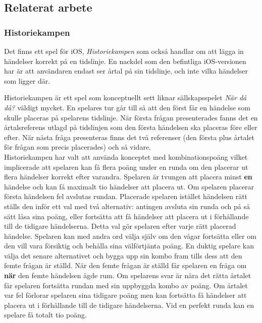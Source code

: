 \documentclass[a4paper, 11pt]{article}
\begin{document}
\subsection{Relaterat arbete}

\subsubsection{Historiekampen}
Det finns ett spel för iOS, \textit{Historiekampen} \cite{historiekampen} som också handlar om att lägga in händelser korrekt på en tidslinje. En nackdel som den befintliga iOS-versionen har är att användaren endast ser årtal på sin tidslinje, och inte vilka händelser som ligger där.

Historiekampen är ett spel som konceptuellt sett liknar sällskapsspelet \textit{När då då?} väldigt mycket. En spelares tur går till så att den först får en händelse som skulle placeras på spelarens tidslinje. När första frågan presenterades fanns det en årtalsreferens utlagd på tidslinjen som den första händelsen ska placeras före eller efter. När nästa fråga presenteras finns det två referenser (den första plus årtalet för frågan som precis placerades) och så vidare.\\ 
Historiekampen har valt att använda konceptet med kombinationspoäng vilket implicerade att spelaren kan få flera poäng under en runda om den placerar ut flera händelser korrekt efter varandra. Spelaren är tvungen att placera minst \textbf{en} händelse och kan få maximalt tio händelser att placera ut. Om spelaren placerar första händelsen fel avslutas rundan. Placerade spelaren istället händelsen rätt ställs den inför ett val med två alternativ: antingen avsluta sin runda och på så sätt låsa sina poäng, eller fortsätta att få händelser att placera ut i förhållande till de tidigare händelserna. Detta val gör spelaren efter varje rätt placerad händelse. Spelaren kan med andra ord välja själv om den vågar fortsätta eller om den vill vara försiktig och behålla sina välförtjänta poäng. En duktig spelare kan välja det senare alternativet och bygga upp sin kombo fram tills dess att den femte frågan är ställd. När den femte frågan är ställd får spelaren en fråga om \textbf{när} den femte händelsen ägde rum. Om spelarens svar är nära det rätta årtalet får spelaren fortsätta rundan med sin uppbyggda kombo av poäng. Om årtalet var fel förlorar spelaren sina tidigare poäng men kan fortsätta få händelser att placera ut i förhållande till de tidigare händelserna. Vid en perfekt runda kan en spelare få totalt tio poäng.
\end{document}
